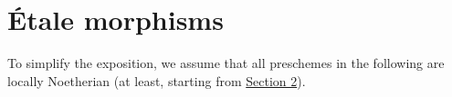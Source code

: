 \chapter{\'{E}tale morphisms}
\label{I}

To simplify the exposition, we assume that all preschemes in the following are locally Noetherian (at least, starting from \hyperref[I.2]{Section 2}).











